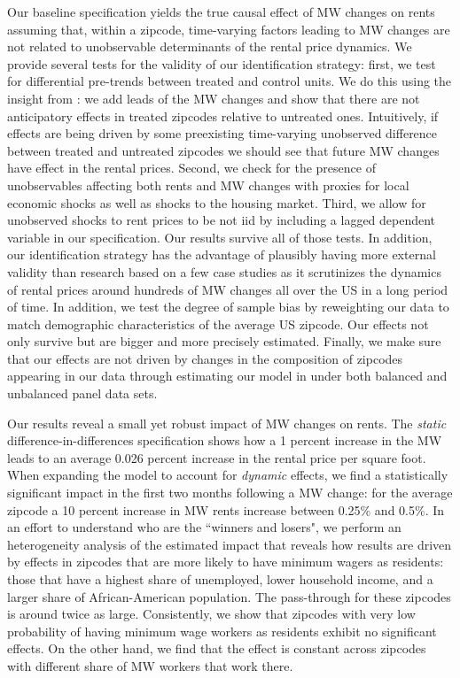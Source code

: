 Our baseline specification yields the true causal effect of MW changes on rents assuming that, 
within a zipcode, time-varying factors leading to MW changes are not related to unobservable 
determinants of the rental price dynamics. We provide several tests for the validity of our 
identification strategy: first, we test for differential pre-trends between treated and control 
units. We do this using the insight from \textcite{granger1969investigating}: we add leads of the 
MW changes and show that there are not anticipatory effects in treated zipcodes relative to 
untreated ones. Intuitively, if effects are being driven by some preexisting time-varying 
unobserved difference between treated and untreated zipcodes we should see that future MW changes 
have effect in the rental prices. Second, we check for the presence of unobservables affecting both 
rents and MW changes with proxies for local economic shocks as well as shocks to the housing market. 
Third, we allow for unobserved shocks to rent prices to be not iid by including a lagged dependent 
variable in our specification. Our results survive all of those tests. In addition, our identification 
strategy has the advantage of plausibly having more external validity than research based on a few 
case studies as it scrutinizes the dynamics of rental prices around hundreds of MW changes all over 
the US in a long period of time. In addition, we test the degree of sample bias by reweighting our 
data to match demographic characteristics of the average US zipcode. Our effects not only survive 
but are bigger and more precisely estimated. Finally, we make sure that our effects are not driven 
by changes in the composition of zipcodes appearing in our data through estimating our model in 
under both balanced and unbalanced panel data sets. 

Our results reveal a small yet robust impact of MW changes on rents. The \textit{static} 
difference-in-differences specification shows how a 1 percent increase in the MW leads to an average 
0.026 percent increase in the rental price per square foot. When expanding the model to account for 
\textit{dynamic} effects, we find a statistically significant impact in the first two months following 
a MW change: for the average zipcode a 10 percent increase in MW rents increase between 0.25\% and 
0.5\%. In an effort to understand who are the ``winners and losers", we perform an heterogeneity 
analysis of the estimated impact that reveals how results are driven by effects in zipcodes that are 
more likely to have minimum wagers as residents: those that have a highest share of unemployed, lower 
household income, and a larger share of African-American population. The pass-through for these 
zipcodes is around twice as large. Consistently, we show that zipcodes with very low probability of 
having minimum wage workers as residents exhibit no significant effects. On the other hand, we find 
that the effect is constant across zipcodes with different share of MW workers that work there.

